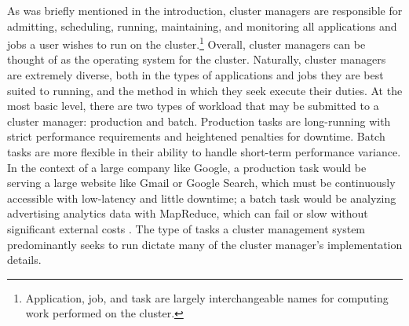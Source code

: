 As was briefly mentioned in the introduction, cluster managers are responsible
for admitting, scheduling, running, maintaining, and monitoring all applications
and jobs a user wishes to run on the cluster.\footnote{Application, job, and
task are largely interchangeable names for computing work performed on the
cluster.} Overall, cluster managers can be thought of as the
operating system for the cluster. Naturally, cluster managers are
extremely diverse, both in the types of applications and jobs they are best
suited to running, and the method in which they seek execute their duties.
At the most basic level, there are two types of workload that may be submitted
to a cluster manager: production and batch. Production tasks are long-running
with strict performance requirements and heightened penalties for downtime. Batch tasks are
more flexible in their ability to handle short-term performance variance. In the
context of a large company like Google, a production task would be serving a
large website like Gmail or Google Search, which must be continuously
accessible with low-latency
and little downtime; a batch task would be analyzing advertising analytics data
with MapReduce, which can fail or slow without significant external
costs \cite{borg}. The type of tasks a cluster management system
predominantly seeks to run dictate many of the cluster manager's implementation details.


